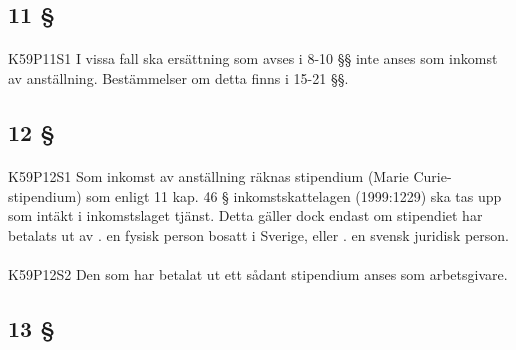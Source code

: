 \documentclass[a4paper,notitlepage,openany,10pt]{book}
\begin{document}
\subsection*{11 §}
\paragraph*{}
{\tiny K59P11S1}
I vissa fall ska ersättning som avses i 8-10 §§ inte anses som inkomst av anställning. Bestämmelser om detta finns i 15-21 §§.
\subsection*{12 §}
\paragraph*{}
{\tiny K59P12S1}
Som inkomst av anställning räknas stipendium (Marie Curie-stipendium) som enligt 11 kap. 46 § inkomstskattelagen (1999:1229) ska tas upp som intäkt i inkomstslaget tjänst.
Detta gäller dock endast om stipendiet har betalats ut av
. en fysisk person bosatt i Sverige, eller
. en svensk juridisk person.
\paragraph*{}
{\tiny K59P12S2}
Den som har betalat ut ett sådant stipendium anses som arbetsgivare.
\subsection*{13 §}
\end{document}
